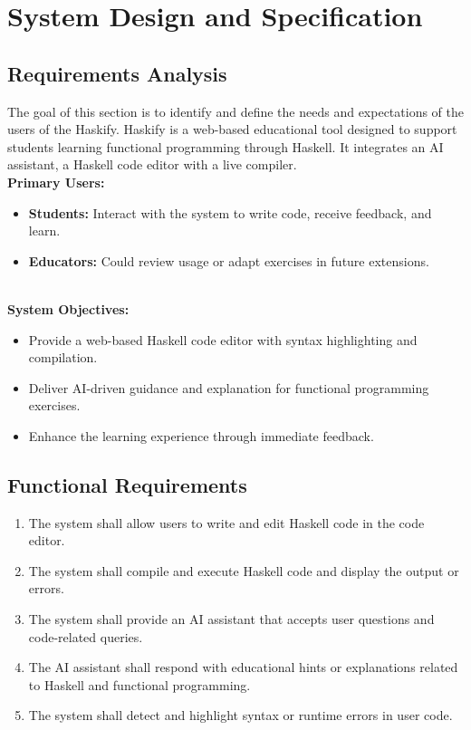\chapter{System Design and Specification}

\section{Requirements Analysis}

The goal of this section is to identify and define the needs and expectations of the users of the Haskify. Haskify is a web-based educational tool designed to support students learning functional programming through Haskell. It integrates an AI assistant, a Haskell code editor with a live compiler.
\\ 
\newline
\textbf{Primary Users:}
\begin{itemize}
  \item \textbf{Students:} Interact with the system to write code, receive feedback, and learn.
  \item \textbf{Educators:} Could review usage or adapt exercises in future extensions.
\end{itemize}
\\
\textbf{System Objectives:}
\begin{itemize}
  \item Provide a web-based Haskell code editor with syntax highlighting and compilation.
  \item Deliver AI-driven guidance and explanation for functional programming exercises.
  \item Enhance the learning experience through immediate feedback.
\end{itemize}

\section{Functional Requirements}

\begin{enumerate}[label=FR\arabic*:]
  \item The system shall allow users to write and edit Haskell code in the code editor.
  \item The system shall compile and execute Haskell code and display the output or errors.
  \item The system shall provide an AI assistant that accepts user questions and code-related queries.
  \item The AI assistant shall respond with educational hints or explanations related to Haskell and functional programming.
  \item The system shall detect and highlight syntax or runtime errors in user code.
\end{enumerate}

